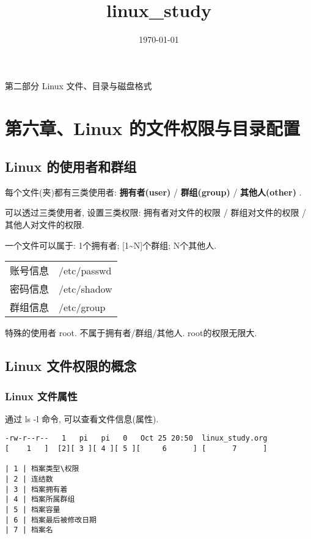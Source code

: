 \documentclass[11pt]{article}
\date{\today}
\title{linux\_study}
\begin{document}
\maketitle
\tableofcontents

第二部分 Linux 文件、目录与磁盘格式
\section{第六章、Linux 的文件权限与目录配置}
\label{sec-1}

\subsection{Linux 的使用者和群组}
\label{sec-1-1}

每个文件(夹)都有三类使用者: \textbf{拥有者(user)} / \textbf{群组(group)} / \textbf{其他人(other)} .

可以透过三类使用者, 设置三类权限: 拥有者对文件的权限 / 群组对文件的权限 / 其他人对文件的权限.

一个文件可以属于: 1个拥有者; [1\textasciitilde{}N]个群组; N个其他人.

\begin{center}
\begin{tabular}{ll}
账号信息 & /etc/passwd\\
密码信息 & /etc/shadow\\
群组信息 & /etc/group\\
\end{tabular}
\end{center}

特殊的使用者 root. 不属于拥有者/群组/其他人. root的权限无限大.

\subsection{Linux 文件权限的概念}
\label{sec-1-2}

\subsubsection{Linux 文件属性}
\label{sec-1-2-1}
通过 ls -l 命令, 可以查看文件信息(属性).
\begin{verbatim}
-rw-r--r--   1   pi   pi   0   Oct 25 20:50  linux_study.org
[    1   ]  [2][ 3 ][ 4 ][ 5 ][     6      ] [      7      ]     

| 1 | 档案类型\权限 
| 2 | 连结数 
| 3 | 档案拥有着
| 4 | 档案所属群组 
| 5 | 档案容量  
| 6 | 档案最后被修改日期
| 7 | 档案名
\end{verbatim}
\end{document}
